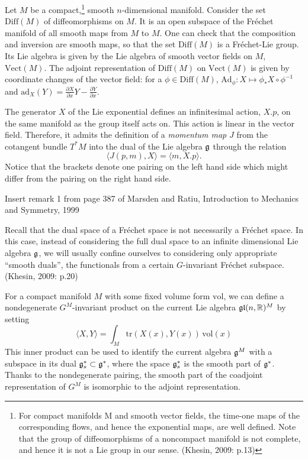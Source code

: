 \documentclass{article}
\theoremstyle{plain}
\theoremstyle{definition}
\newcommand{\R}{\ensuremath{\mathbb{R}}}
\newcommand{\Diff}{\ensuremath{\mathrm{Diff}}}
\newcommand{\Vol}{\ensuremath{\mathrm{vol}}}
\newcommand{\Vect}{\ensuremath{\mathrm{Vect}}}
\newcommand{\Ad}{\ensuremath{\mathrm{Ad}}}
\newcommand{\ad}{\ensuremath{\mathrm{ad}}}
\newcommand{\tr}{\ensuremath{\mathrm{tr}}}
\newcommand{\mf}{\ensuremath{\mathfrak}}
\begin{document}
Let $M$ be a compact,\footnote{For compact manifolds M and smooth vector fields, the time-one maps of the corresponding flows, and hence the exponential maps, are well defined. Note that the group of diffeomorphisms of a noncompact manifold is not complete, and hence it is not a Lie group in our sense. (Khesin, 2009: p.13)} 
smooth $n$-dimensional manifold. Consider the
set $\Diff(M)$ of diffeomorphisms on $M$. It is an open subspace of the Fréchet
manifold of all smooth maps from $M$ to $M$. One can check that the composition
and inversion are smooth maps, so that the set $\Diff(M)$ is a Fréchet-Lie group. Its Lie algebra is given by the Lie algebra of smooth vector fields on $M$, $\Vect(M)$. The adjoint representation of $\Diff(M)$ on $\Vect(M)$ is given by coordinate changes of the vector field: for a $\phi\in\Diff(M)$, $\Ad_\phi:X\mapsto \phi_*X\circ \phi^{-1}$ and $\ad_X(Y)=\frac{\partial X}{\partial x}Y-\frac{\partial Y}{\partial x}$.

The generator $X$ of the Lie exponential defines an infinitesimal action, $X.p$, on the same manifold as the group itself acts on. This action is linear in the vector field. Therefore, it admits the definition of a \textit{momentum map} $J$ from the cotangent bundle $T^*M$ into the dual of the Lie algebra $\mf g$ through the relation
\[
\langle J(p,m),X\rangle = \langle m,X.p\rangle.
\]
Notice that the brackets denote one pairing on the left hand side which might differ from the pairing on the right hand side.

Insert remark 1 from page 387 of Marsden and Ratiu, Introduction to Mechanics and Symmetry, 1999



Recall that the dual space of a Fréchet space is not necessarily a Fréchet space. In this case, instead of considering the full dual space to an infinite dimensional Lie algebra $\mf g$, we will usually confine ourselves to considering only appropriate ``smooth duals'', the functionals from a certain $G$-invariant Fréchet subspace. (Khesin, 2009: p.20)

For a compact manifold $M$ with some fixed volume form $\Vol$, we can
define a nondegenerate $G^M$-invariant product on the current Lie algebra $\mf g\mf l(n,\R)^M$ by setting
\[
\langle X,Y\rangle = \int_M\tr(X(x),Y(x))\,\Vol(x)
\]
This inner product can be used to identify the current algebra $\mf g^M$ with a subspace in its dual $\mf g_s^*\subset \mf g^*$, where the space $\mf g_s^*$ is the smooth part of $\mf g^*$. Thanks to the nondegenerate pairing, the smooth part of the coadjoint representation of $G^M$ is isomorphic to the adjoint representation.
\end{document}
